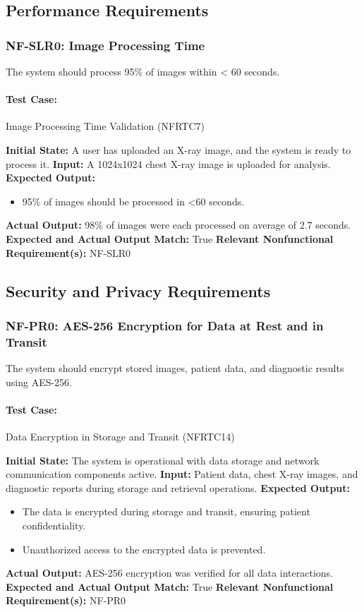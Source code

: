 \documentclass[12pt, titlepage]{article}
\begin{document}
\subsection{Performance Requirements}

\subsubsection{NF-SLR0: Image Processing Time}
The system should process 95\% of images within < 60 seconds.

\paragraph{Test Case:} Image Processing Time Validation (NFRTC7)

\textbf{Initial State:} A user has uploaded an X-ray image, and the system is ready to process it.  
\textbf{Input:} A 1024x1024 chest X-ray image is uploaded for analysis.  
\textbf{Expected Output:}
\begin{itemize}
    \item 95\% of images should be processed in <60 seconds.
\end{itemize}
\textbf{Actual Output:} 98\% of images were each processed on average of 2.7 seconds.  
\textbf{Expected and Actual Output Match:} True  
\textbf{Relevant Nonfunctional Requirement(s):} NF-SLR0  

\subsection{Security and Privacy Requirements}

\subsubsection{NF-PR0: AES-256 Encryption for Data at Rest and in Transit}
The system should encrypt stored images, patient data, and diagnostic results using AES-256.

\paragraph{Test Case:} Data Encryption in Storage and Transit (NFRTC14)

\textbf{Initial State:} The system is operational with data storage and network communication components active.  
\textbf{Input:} Patient data, chest X-ray images, and diagnostic reports during storage and retrieval operations.  
\textbf{Expected Output:}
\begin{itemize}
    \item The data is encrypted during storage and transit, ensuring patient confidentiality.
    \item Unauthorized access to the encrypted data is prevented.
\end{itemize}
\textbf{Actual Output:} AES-256 encryption was verified for all data interactions.  
\textbf{Expected and Actual Output Match:} True  
\textbf{Relevant Nonfunctional Requirement(s):} NF-PR0  
\end{document}
